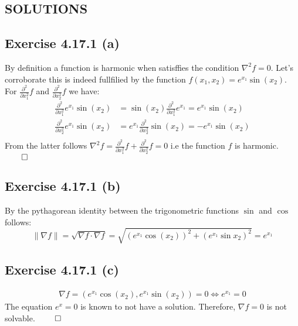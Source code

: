 \documentclass{exam}
\renewenvironment{proof}{{\noindent\itshape\ignorespaces}}{{\hfill$\qed$\\}}
\begin{document}
\newpage

\begin{center}    
    \section*{SOLUTIONS}
\end{center}

\subsection*{Exercise 4.17.1 (a)}
    By definition a function is harmonic when satisffies the condition $\nabla^{2}f = 0$. Let's corroborate this is indeed fullfilied by the function 
    $f(x_1,x_2) = e^{x_1}\sin(x_2)$. For $\frac{\partial^{2}}{ \partial x^{2}_1}f$ and $\frac{\partial^{2}}{ \partial x^{2}_2}f$ we have:\\
    \begin{proof}
        \begin{equation*}     
            \begin{aligned}
                \frac{\partial^{2}}{ \partial x^{2}_1} e^{x_1}\sin(x_2) &=  \sin(x_2)\frac{\partial^{2}}{ \partial x^{2}_1} e^{x_1} = e^{x_1}\sin(x_2)\\
                \frac{\partial^{2}}{ \partial x^{2}_2} e^{x_1}\sin(x_2) &=  e^{x_1}\frac{\partial^{2}}{ \partial x^{2}_2}\sin(x_2)  = -e^{x_1}\sin(x_2)\\
            \end{aligned}
    \end{equation*}
    From the latter follows $\nabla^{2}f = \displaystyle\frac{\partial^{2}}{ \partial x^{2}_1}f + \displaystyle\frac{\partial^{2}}{ \partial x^{2}_2}f = 0$ i.e the function $f$ is harmonic.
    \end{proof}
\subsection*{Exercise 4.17.1 (b)}
By the pythagorean identity between the trigonometric functions $\sin$ and $\cos$ follows:\\
\begin{equation*}
    \lVert \nabla f \lVert = \sqrt{\nabla f \cdot \nabla f} = \sqrt{(e^{x_1}\cos(x_2))^{2} + (e^{x_1}\sin{x_2})^{2}} = e^{x_1}
\end{equation*}
\subsection*{Exercise 4.17.1 (c)}
\begin{proof}
    \begin{equation*}     
        \begin{aligned}
            \nabla f = (e^{x_1}\cos(x_2), e^{x_1}\sin(x_2)) = 0 \iff e^{x_1} = 0 
        \end{aligned}
\end{equation*}
The equation $e^{x} = 0$ is known to not have a solution. Therefore, $\nabla f = 0$ is not solvable.
\end{proof}
\end{document}
